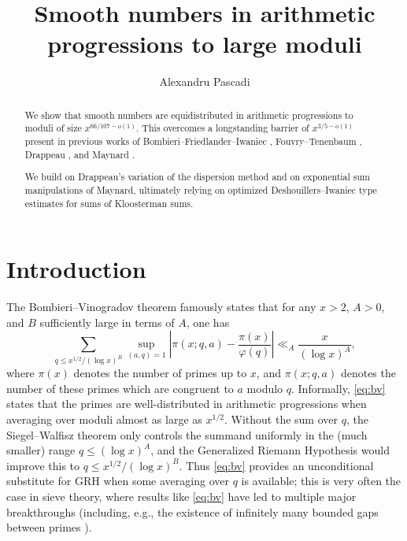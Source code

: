 \documentclass[reqno,11pt]{amsart}
\title{Smooth numbers in arithmetic progressions to large moduli}
\author[Alexandru Pascadi]{Alexandru Pascadi}
\theoremstyle{definition}
\theoremstyle{remark}
\numberwithin{equation}{section}
\newcommand{\fix}[1]{\textcolor{myBlue}{\large (#1)\normalsize}}
\begin{document}
\maketitle

\begin{abstract}
    We show that smooth numbers are equidistributed in arithmetic progressions to moduli of size $x^{66/107-o(1)}$. This overcomes a longstanding barrier of $x^{3/5-o(1)}$ present in previous works of Bombieri--Friedlander--Iwaniec \cite{bombieri1986primes,bombieri1987primes2}, Fouvry--Tenenbaum \cite{fouvry1982repartition}, Drappeau \cite{drappeau2015theoremes}, and Maynard \cite{maynard2020primesII}.

    We build on Drappeau's variation of the dispersion method and on exponential sum manipulations of Maynard, ultimately relying on optimized Deshouillers--Iwaniec type estimates for sums of Kloosterman sums.
\end{abstract}

{
\setlength{\parskip}{0em}
\setcounter{tocdepth}{1}
\tableofcontents
}
\vspace{-1cm}

\section{Introduction} \label{sec:intro} 
The Bombieri--Vinogradov theorem \cite{bombieri1965large,vinogradov1965density} famously states that for any $x > 2$, $A > 0$, and $B$ sufficiently large in terms of $A$, one has
\begin{equation} \label{eq:bv}
    \sum_{q \le x^{1/2}/(\log x)^B} \sup_{(a, q) = 1} 
    \left\vert \pi(x; q, a) - \frac{\pi(x)}{\varphi(q)} \right\vert 
    \ll_A 
    \frac{x}{(\log x)^A},
\end{equation}
where $\pi(x)$ denotes the number of primes up to $x$, and $\pi(x; q, a)$ denotes the number of these primes which are congruent to $a$ modulo $q$. Informally, \cref{eq:bv} states that the primes are well-distributed in arithmetic progressions when averaging over moduli almost as large as $x^{1/2}$. Without the sum over $q$, the Siegel--Walfisz theorem only controls the summand uniformly in the (much smaller) range $q \le (\log x)^A$, and the Generalized Riemann Hypothesis would improve this to $q \le x^{1/2}/(\log x)^B$. Thus \cref{eq:bv} provides an unconditional substitute for GRH when some averaging over $q$ is available; this is very often the case in sieve theory, where results like \cref{eq:bv} have led to multiple major breakthroughs (including, e.g., the existence of infinitely many bounded gaps between primes \cite{zhang2014bounded,castryck2014new,maynard2015small,polymath2014variants}). %
\end{document}
